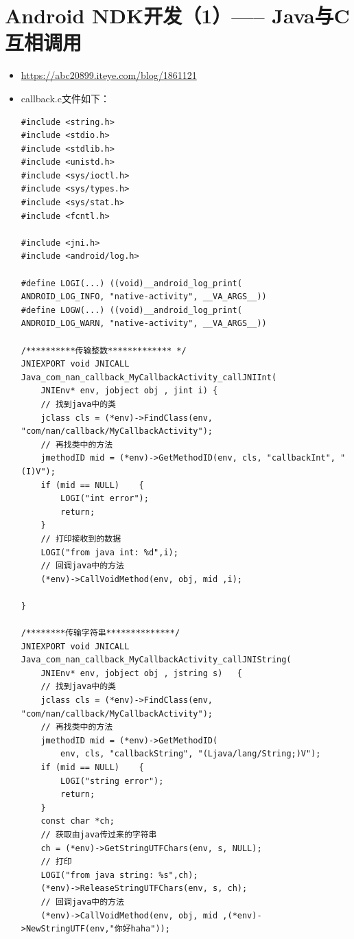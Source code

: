 \documentclass[9pt, b5paper]{article}
\begin{document}
\section{Android NDK开发（1）----- Java与C互相调用}
\label{sec-3}
\begin{itemize}
\item \url{https://abc20899.iteye.com/blog/1861121}
\item callback.c文件如下：
\begin{verbatim}
#include <string.h>  
#include <stdio.h>  
#include <stdlib.h>  
#include <unistd.h>  
#include <sys/ioctl.h>  
#include <sys/types.h>  
#include <sys/stat.h>  
#include <fcntl.h>  
   
#include <jni.h>  
#include <android/log.h>  
   
#define LOGI(...) ((void)__android_log_print(
ANDROID_LOG_INFO, "native-activity", __VA_ARGS__))  
#define LOGW(...) ((void)__android_log_print(
ANDROID_LOG_WARN, "native-activity", __VA_ARGS__))  
   
/**********传输整数************* */  
JNIEXPORT void JNICALL Java_com_nan_callback_MyCallbackActivity_callJNIInt(
    JNIEnv* env, jobject obj , jint i) {  
    // 找到java中的类  
    jclass cls = (*env)->FindClass(env, "com/nan/callback/MyCallbackActivity");  
    // 再找类中的方法  
    jmethodID mid = (*env)->GetMethodID(env, cls, "callbackInt", "(I)V");  
    if (mid == NULL)    {  
        LOGI("int error");  
        return;    
    }  
    // 打印接收到的数据  
    LOGI("from java int: %d",i);  
    // 回调java中的方法  
    (*env)->CallVoidMethod(env, obj, mid ,i);  
           
}      
   
/********传输字符串**************/  
JNIEXPORT void JNICALL Java_com_nan_callback_MyCallbackActivity_callJNIString(
    JNIEnv* env, jobject obj , jstring s)   {  
    // 找到java中的类  
    jclass cls = (*env)->FindClass(env, "com/nan/callback/MyCallbackActivity");  
    // 再找类中的方法  
    jmethodID mid = (*env)->GetMethodID(
        env, cls, "callbackString", "(Ljava/lang/String;)V");  
    if (mid == NULL)    {  
        LOGI("string error");  
        return;    
    }  
    const char *ch;  
    // 获取由java传过来的字符串  
    ch = (*env)->GetStringUTFChars(env, s, NULL);  
    // 打印  
    LOGI("from java string: %s",ch);  
    (*env)->ReleaseStringUTFChars(env, s, ch);      
    // 回调java中的方法  
    (*env)->CallVoidMethod(env, obj, mid ,(*env)->NewStringUTF(env,"你好haha"));  
   

\end{verbatim}
\end{itemize}
\end{document}
